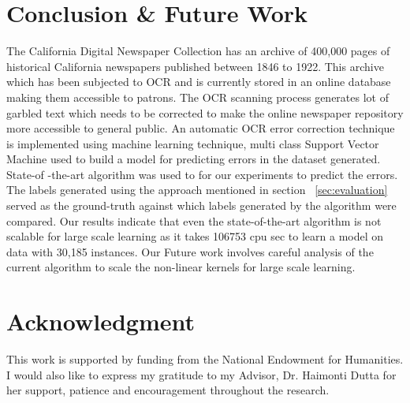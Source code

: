 \documentclass[letterpaper]{article}
\begin{document}
\section{Conclusion \& Future Work}
\label{sec:conc}
The California Digital Newspaper Collection has an archive of 400,000 pages of historical California newspapers published between 1846 to 1922. This archive which has been subjected to OCR and is currently stored in an online database making them accessible to patrons. The OCR scanning process generates lot of garbled text which needs to be corrected to make the online newspaper repository more accessible to general public. An automatic OCR error correction technique is implemented using machine learning technique, multi class Support Vector Machine used to build a model for predicting errors in the dataset generated. State-of -the-art algorithm \cite{algo} was used to for our experiments to predict the errors. The labels generated using the approach mentioned in section ~\ref{sec:evaluation} served as the ground-truth against which labels generated by the algorithm were compared. Our results indicate that even the state-of-the-art algorithm is not scalable for large scale learning as it takes 106753 cpu sec to learn a model on data with 30,185 instances.
Our Future work involves careful analysis of the current algorithm to scale the non-linear kernels for large scale learning.


\section*{Acknowledgment}
This work is supported by funding from the National Endowment for Humanities. I would also like to express my gratitude to my Advisor, Dr. Haimonti Dutta for her support, patience and encouragement throughout the research.\\

\nocite{carlson,massive,Gao,Huang,hoi2006large,menon2009large,notes,Thorsten,DBLP:journals/csur/Kukich92,Reynaert2008a,Niklas2010,Tong96astatistical,post-correction,lowcost,bookscount,gblp,recaptcha,velagapudi,hybred,comparison,dagsvm,onlineSpelling,britishLibrary,crowd, postprocessing,statistical,contextbased,multiclassSVM_ecoc}



\end{document}
